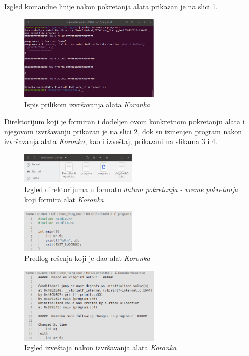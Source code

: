 \documentclass[12pt,oneside]{memoir}
\theoremstyle{plain}
\theoremstyle{definition}
\begin{document}
Izgled komandne linije nakon pokretanja alata prikazan je na slici \ref{fig:slika4.11}. 
\begin{figure}[!ht]
  \centering
  \includegraphics[width=0.6\textwidth]{TerminalOutput.png}
  \caption{Ispis prilikom izvršavanja alata \textit{Koronka}}
  \label{fig:slika4.11}
\end{figure}

Direktorijum koji je formiran i dodeljen ovom konkretnom pokretanju alata i njegovom izvršavanju prikazan je na slici \ref{fig:slika4.12}, dok su izmenjen program nakon izvršavanja alata \textit{Koronka}, kao i izveštaj, prikazani na slikama \ref{fig:slika4.13} i \ref{fig:slika4.14}.
\begin{figure}[!ht]
  \centering
  \includegraphics[width=0.5\textwidth]{DateTimeFolder.png}
  \caption{Izgled direktorijuma u formatu \textit{datum pokretanja - vreme pokretanja} koji formira alat \textit{Koronka}}
  \label{fig:slika4.12}
\end{figure}

\begin{figure}[!ht]
  \centering
  \includegraphics[width=0.5\textwidth]{FixedProgram.png}
  \caption{Predlog rešenja koji je dao alat \textit{Koronka}}
  \label{fig:slika4.13}
\end{figure}

\begin{figure}[!ht]
  \centering
  \includegraphics[width=0.6\textwidth]{ExecutionReport.png}
  \caption{Izgled izveštaja nakon izvršavanja alata \textit{Koronka}}
  \label{fig:slika4.14}
\end{figure}
\end{document}

